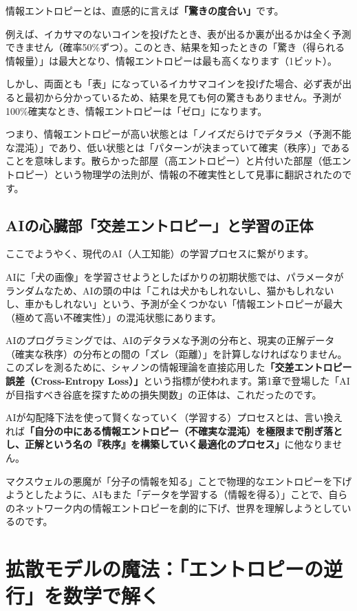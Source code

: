 情報エントロピーとは、直感的に言えば\textbf{「驚きの度合い」}です。

例えば、イカサマのないコインを投げたとき、表が出るか裏が出るかは全く予測できません（確率50\%ずつ）。このとき、結果を知ったときの「驚き（得られる情報量）」は最大となり、情報エントロピーは最も高くなります（1ビット）。

しかし、両面とも「表」になっているイカサマコインを投げた場合、必ず表が出ると最初から分かっているため、結果を見ても何の驚きもありません。予測が100\%確実なとき、情報エントロピーは「ゼロ」になります。

つまり、情報エントロピーが高い状態とは「ノイズだらけでデタラメ（予測不能な混沌）」であり、低い状態とは「パターンが決まっていて確実（秩序）」であることを意味します。散らかった部屋（高エントロピー）と片付いた部屋（低エントロピー）という物理学の法則が、情報の不確実性として見事に翻訳されたのです。

\subsection{AIの心臓部「交差エントロピー」と学習の正体}

ここでようやく、現代のAI（人工知能）の学習プロセスに繋がります。

AIに「犬の画像」を学習させようとしたばかりの初期状態では、パラメータがランダムなため、AIの頭の中は「これは犬かもしれないし、猫かもしれないし、車かもしれない」という、予測が全くつかない「情報エントロピーが最大（極めて高い不確実性）」の混沌状態にあります。

AIのプログラミングでは、AIのデタラメな予測の分布と、現実の正解データ（確実な秩序）の分布との間の「ズレ（距離）」を計算しなければなりません。このズレを測るために、シャノンの情報理論を直接応用した\textbf{「交差エントロピー誤差（Cross-Entropy Loss）」}という指標が使われます。第1章で登場した「AIが目指すべき谷底を探すための損失関数」の正体は、これだったのです。

AIが勾配降下法を使って賢くなっていく（学習する）プロセスとは、言い換えれば\textbf{「自分の中にある情報エントロピー（不確実な混沌）を極限まで削ぎ落とし、正解という名の『秩序』を構築していく最適化のプロセス」}に他なりません。

マクスウェルの悪魔が「分子の情報を知る」ことで物理的なエントロピーを下げようとしたように、AIもまた「データを学習する（情報を得る）」ことで、自らのネットワーク内の情報エントロピーを劇的に下げ、世界を理解しようとしているのです。

\section{拡散モデルの魔法：「エントロピーの逆行」を数学で解く}

